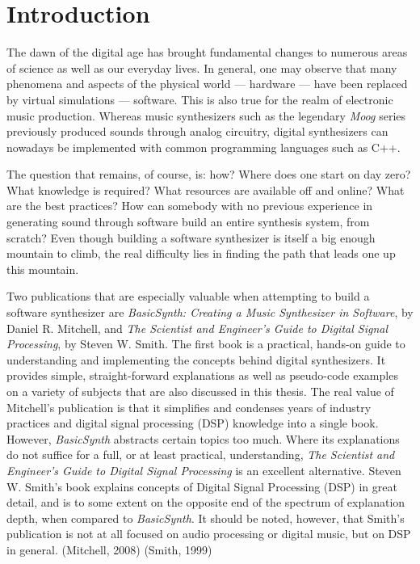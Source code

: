 \chapter*{Introduction}

The dawn of the digital age has brought fundamental changes to numerous areas of science as well as our everyday lives. In general, one may observe that many phenomena and aspects of the physical world --- hardware --- have been replaced by virtual simulations --- software. This is also true for the realm of electronic music production. Whereas music synthesizers such as the legendary \emph{Moog}\footnotemark{} series previously produced sounds through analog circuitry, digital synthesizers can nowadays be implemented with common programming languages such as C++.\vspace{\baselineskip}


The question that remains, of course, is: how? Where does one start on day zero? What knowledge is required? What resources are available off and online? What are the best practices? How can somebody with no previous experience in generating sound through software build an entire synthesis system, from scratch? Even though building a software synthesizer is itself a big enough mountain to climb, the real difficulty lies in finding the path that leads one up this mountain. \vspace{\baselineskip}

Two publications that are especially valuable when attempting to build a software synthesizer are \emph{BasicSynth: Creating a Music Synthesizer in Software}, by Daniel R. Mitchell, and \emph{The Scientist and Engineer's Guide to Digital Signal Processing}, by Steven W. Smith. The first book is a practical, hands-on guide to understanding and implementing the concepts behind digital synthesizers. It provides simple, straight-forward explanations as well as pseudo-code examples on a variety of subjects that are also discussed in this thesis. The real value of Mitchell's publication is that it simplifies and condenses years of industry practices and digital signal processing (DSP) knowledge into a single book. However, \emph{BasicSynth} abstracts certain topics too much. Where its explanations do not suffice for a full, or at least practical, understanding, \emph{The Scientist and Engineer's Guide to Digital Signal Processing} is an excellent alternative. Steven W. Smith's book explains concepts of Digital Signal Processing (DSP) in great detail, and is to some extent on the opposite end of the spectrum of explanation depth, when compared to \emph{BasicSynth}. It should be noted, however, that Smith's publication is not at all focused on audio processing or digital music, but on DSP in general. (Mitchell, 2008) (Smith, 1999)\vspace{\baselineskip}

